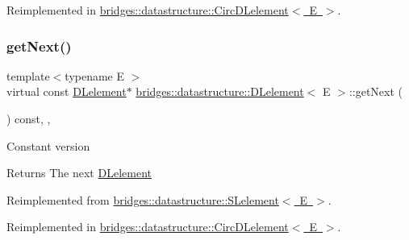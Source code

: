 Reimplemented in \mbox{\hyperlink{classbridges_1_1datastructure_1_1_circ_d_lelement_a80681d0382643a6df21da1bec4067004}{bridges\+::datastructure\+::\+Circ\+D\+Lelement$<$ E $>$}}.

\mbox{\label{classbridges_1_1datastructure_1_1_d_lelement_a8599e5be5fc1771d4e8a40f6de67b4a7}} 
\subsubsection{\texorpdfstring{getNext()}{getNext()}\hspace{0.1cm}{\footnotesize\ttfamily [2/2]}}
{\footnotesize\ttfamily template$<$typename E $>$ \\
virtual const \mbox{\hyperlink{classbridges_1_1datastructure_1_1_d_lelement}{D\+Lelement}}$\ast$ \mbox{\hyperlink{classbridges_1_1datastructure_1_1_d_lelement}{bridges\+::datastructure\+::\+D\+Lelement}}$<$ E $>$\+::get\+Next (\begin{DoxyParamCaption}{ }\end{DoxyParamCaption}) const\hspace{0.3cm}{\ttfamily [inline]}, {\ttfamily [override]}, {\ttfamily [virtual]}}

Constant version

\begin{DoxyReturn}{Returns}
The next \mbox{\hyperlink{classbridges_1_1datastructure_1_1_d_lelement}{D\+Lelement}} 
\end{DoxyReturn}


Reimplemented from \mbox{\hyperlink{classbridges_1_1datastructure_1_1_s_lelement_a8c62cb82fa64bbfe9ebb7334a5fea417}{bridges\+::datastructure\+::\+S\+Lelement$<$ E $>$}}.



Reimplemented in \mbox{\hyperlink{classbridges_1_1datastructure_1_1_circ_d_lelement_a3b54f07ffa49151ed13d8b8df964a4ee}{bridges\+::datastructure\+::\+Circ\+D\+Lelement$<$ E $>$}}.

\mbox{\label{classbridges_1_1datastructure_1_1_d_lelement_ac0b2dd38b3e3acee503152c9aa88f61c}} 
